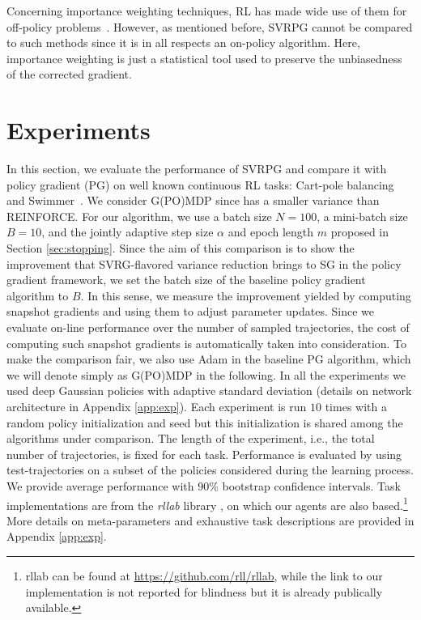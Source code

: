 \documentclass{article}
\makeatletter
\theoremstyle{remark}
\theoremstyle{definition}
\DeclareRobustCommand{\eg}{e.g.,\@\xspace}
\DeclareRobustCommand{\ie}{i.e.,\@\xspace}
\newcommand{\vtheta}{\boldsymbol{\theta}}
\newcommand{\Reward}{\mathcal{R}}
\newcommand{\score}[2]{\nabla\log p_{#1}(#2)}
\makeatother
\begin{document}
Concerning importance weighting techniques, RL has made wide use of them for off-policy problems~\citep[\eg][]{precup2000eligibility,thomas2015high}. However, as mentioned before, SVRPG cannot be compared to such methods since it is in all respects an on-policy algorithm. Here, importance weighting is just a statistical tool used to preserve the unbiasedness of the corrected gradient.

\section{Experiments}\label{sec:exp}
In this section, we evaluate the performance of SVRPG and compare it with policy gradient (PG) on well known continuous RL tasks: Cart-pole balancing and Swimmer~\citep[\eg][]{duan2016benchmarking}.
We consider G(PO)MDP since has a smaller variance than REINFORCE.
For our algorithm, we use a batch size $N=100$, a mini-batch size $B=10$, and the jointly adaptive step size $\alpha$ and epoch length $m$ proposed in Section \ref{sec:stopping}. Since the aim of this comparison is to show the improvement that SVRG-flavored variance reduction brings to SG in the policy gradient framework, we set the batch size of the baseline policy gradient algorithm to $B$. In this sense, we measure the improvement yielded by computing snapshot gradients and using them to adjust parameter updates. Since we evaluate on-line performance over the number of sampled trajectories, the cost of computing such snapshot gradients is automatically taken into consideration. To make the comparison fair, we also use Adam in the baseline PG algorithm, which we will denote simply as G(PO)MDP in the following.
In all the experiments we used deep Gaussian policies with adaptive standard deviation (details on network architecture in Appendix \ref{app:exp}).
Each experiment is run $10$ times with a random policy initialization and seed but this initialization is shared among the algorithms under comparison.
The length of the experiment, \ie the total number of trajectories, is fixed for each task. Performance is evaluated by using test-trajectories on a subset of the policies considered during the learning process. We provide average performance with 90\% bootstrap confidence intervals.  
Task implementations are from the \textit{rllab} library \cite{duan2016benchmarking}, on which our agents are also based.\footnote{rllab can be found at \url{https://github.com/rll/rllab}, while the link to our implementation is not reported for blindness but it is already publically available.}
More details on meta-parameters and exhaustive task descriptions are provided in Appendix \ref{app:exp}.
\end{document}
